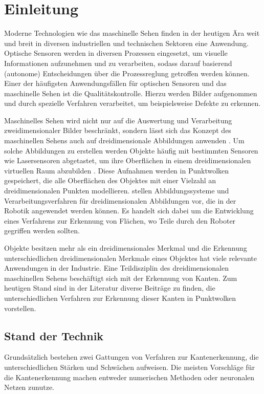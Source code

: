 \chapter{Einleitung}
Moderne Technologien wie das maschinelle Sehen finden in der heutigen Ära weit und breit in diversen industriellen und technischen Sektoren eine Anwendung. Optische Sensoren werden in diversen Prozessen eingesetzt, um visuelle Informationen aufzunehmen und zu verarbeiten, sodass darauf basierend (autonome) Entscheidungen über die Prozessreglung getroffen werden können. Einer der häufigsten Anwendungsfällen für optischen Sensoren und das maschinelle Sehen ist die Qualitätskontrolle. Hierzu werden Bilder aufgenommen und durch spezielle Verfahren verarbeitet, um beispielsweise Defekte zu erkennen. \autocite[3-11]{beyerer_machine_2015}

Maschinelles Sehen wird nicht nur auf die Auswertung und Verarbeitung zweidimensionaler Bilder beschränkt, sondern lässt sich das Konzept des maschinellen Sehens auch auf dreidimensionale Abbildungen anwenden \autocite{biegelbauer_model-based_2010}. Um solche Abbildungen zu erstellen werden Objekte häufig mit bestimmten Sensoren wie Lasersensoren abgetastet, um ihre Oberflächen in einem dreidimensionalen virtuellen Raum abzubilden \autocite[20-22]{savla_intelligente_2022}. Diese Aufnahmen werden in Punktwolken gespeichert, die alle Oberflächen des Objektes mit einer Vielzahl an dreidimensionalen Punkten modellieren. \Textcite{lougheed_3-d_1988} stellen Abbildungssysteme und Verarbeitungsverfahren für dreidimensionalen Abbildungen vor, die in der Robotik angewendet werden können. Es handelt sich dabei um die Entwicklung eines Verfahrens zur Erkennung von Flächen, wo Teile durch den Roboter gegriffen werden sollten. 

Objekte besitzen mehr als ein dreidimensionales Merkmal und die Erkennung unterschiedlichen dreidimensionalen Merkmale eines Objektes hat viele relevante Anwendungen in der Industrie. Eine Teildisziplin des dreidimensionalen maschinellen Sehens beschäftigt sich mit der Erkennung von Kanten. Zum heutigen Stand sind in der Literatur diverse Beiträge zu finden, die unterschiedlichen Verfahren zur Erkennung dieser Kanten in Punktwolken vorstellen.

\section{Stand der Technik}
Grundsätzlich bestehen zwei Gattungen von Verfahren zur Kantenerkennung, die unterschiedlichen Stärken und Schwächen aufweisen. Die meisten Vorschläge für die Kantenerkennung machen entweder numerischen Methoden oder neuronalen Netzen zunutze.

